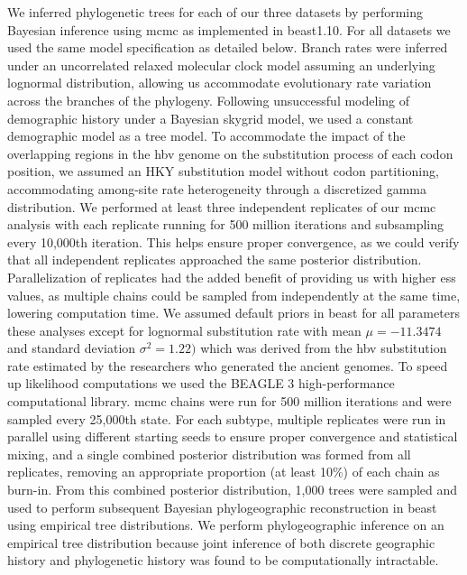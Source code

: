 We inferred phylogenetic trees for each of our three datasets by performing Bayesian inference using \gls{mcmc} as implemented in \gls{beast}1.10\cite{suchard2018bayesian}.
For all datasets we used the same model specification as detailed below.
Branch rates were inferred under an uncorrelated relaxed molecular clock model assuming an underlying lognormal distribution, allowing us accommodate evolutionary rate variation across the branches of the phylogeny.
Following unsuccessful modeling of demographic history under a Bayesian skygrid model\cite{gill2013improving}, we used a constant demographic model as a tree model. %
To accommodate the impact of the overlapping regions in the \gls{hbv} genome on the substitution process of each codon position, we assumed an HKY substitution model\cite{hasegawa1985dating} without codon partitioning, accommodating among-site rate heterogeneity through a discretized gamma distribution\cite{yang1993maximum}.
We performed at least three independent replicates of our \gls{mcmc} analysis with each replicate running for 500 million iterations and subsampling every 10,000th iteration.
This helps ensure proper convergence, as we could verify that all independent replicates approached the same posterior distribution.
Parallelization of replicates had the added benefit of providing us with higher \gls{ess} values, as multiple chains could be sampled from independently at the same time, lowering computation time.
We assumed default priors in \gls{beast} for all parameters these analyses except for lognormal substitution rate with mean $\mu=-11.3474$ and standard deviation $\sigma^{2}=1.22)$ which was derived from the \gls{hbv} substitution rate estimated by the researchers who generated the ancient genomes\cite{muhlemann2018ancient}.
To speed up likelihood computations we used the BEAGLE 3 high-performance computational library.
\gls{mcmc} chains were run for 500 million iterations and were sampled every 25,000th state.
For each subtype, multiple replicates were run in parallel using different starting seeds to ensure proper convergence and statistical mixing, and a single combined posterior distribution was formed from all replicates, removing an appropriate proportion (at least 10\%) of each chain as burn-in.
From this combined posterior distribution, 1,000 trees were sampled and used to perform subsequent Bayesian phylogeographic reconstruction in \gls{beast} using empirical tree distributions.
We perform phylogeographic inference on an empirical tree distribution because joint inference of both discrete geographic history and phylogenetic history was found to be computationally intractable.

